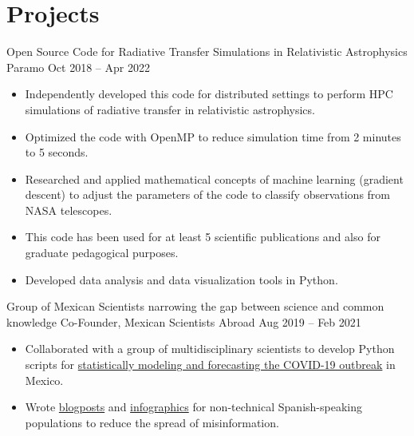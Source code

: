 \section{Projects}
%
{Open Source Code for Radiative Transfer Simulations in Relativistic Astrophysics}%
{Paramo}%
{Oct 2018 -- Apr 2022}%
{}%
{%
\begin{itemize}
    \item Independently developed this code for distributed settings to perform HPC simulations of radiative transfer in relativistic astrophysics.
    \item Optimized the code with OpenMP to reduce simulation time from 2 minutes to 5 seconds.
    \item Researched and applied mathematical concepts of machine learning (gradient descent) to adjust the parameters of the code to classify observations from NASA telescopes.
    \item This code has been used for at least 5 scientific publications and also for graduate pedagogical purposes.
    \item Developed data analysis and data visualization tools in Python.
\end{itemize}
}
%
{Group of Mexican Scientists narrowing the gap between science and common knowledge}%
{Co-Founder, Mexican Scientists Abroad}%
{Aug 2019 -- Feb 2021}%
{}%
{%
\begin{itemize}
    \item Collaborated with a group of multidisciplinary scientists to develop Python scripts for \href{https://mexiciencia.github.io/post/covid19/}{statistically modeling and forecasting the COVID-19 outbreak} in Mexico. 
    \item Wrote \href{https://mexiciencia.github.io/post/modelo-sir/}{blogposts} and \href{https://mexiciencia.github.io/post/anita/}{infographics} for non-technical Spanish-speaking populations to reduce the spread of misinformation.
\end{itemize}
}
